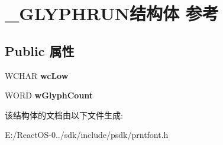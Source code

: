 \hypertarget{struct___g_l_y_p_h_r_u_n}{}\section{\+\_\+\+G\+L\+Y\+P\+H\+R\+U\+N结构体 参考}
\label{struct___g_l_y_p_h_r_u_n}
\subsection*{Public 属性}
\begin{DoxyCompactItemize}
\item 
\mbox{\label{struct___g_l_y_p_h_r_u_n_a218c575d2ebde8c57162c3b9c2572455}} 
W\+C\+H\+AR {\bfseries wc\+Low}
\item 
\mbox{\label{struct___g_l_y_p_h_r_u_n_a5034b232c350bf9cc5c847f9e1302f13}} 
W\+O\+RD {\bfseries w\+Glyph\+Count}
\end{DoxyCompactItemize}


该结构体的文档由以下文件生成\+:\begin{DoxyCompactItemize}
\item 
E\+:/\+React\+O\+S-\/0../sdk/include/psdk/prntfont.\+h\end{DoxyCompactItemize}
